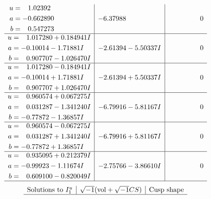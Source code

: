 \documentclass[1p]{elsarticle_modified}
\theoremstyle{definition}
\newcommand{\I}{\sqrt{-1}}
\begin{document}
$$\begin{array}{c|c|c}
\begin{aligned}
u &= \phantom{-}1.02392\phantom{ +0.000000I} \\
a &= -0.662890\phantom{ +0.000000I} \\
b &= \phantom{-}0.547273\phantom{ +0.000000I}\end{aligned}
 & -6.37988\phantom{ +0.000000I} & \phantom{-0.000000 } 0 \\ \hline\begin{aligned}
u &= \phantom{-}1.017280 + 0.184941 I \\
a &= -0.10014 - 1.71881 I \\
b &= \phantom{-}0.907707 - 1.026470 I\end{aligned}
 & -2.61394 - 5.50337 I & \phantom{-0.000000 } 0 \\ \hline\begin{aligned}
u &= \phantom{-}1.017280 - 0.184941 I \\
a &= -0.10014 + 1.71881 I \\
b &= \phantom{-}0.907707 + 1.026470 I\end{aligned}
 & -2.61394 + 5.50337 I & \phantom{-0.000000 } 0 \\ \hline\begin{aligned}
u &= \phantom{-}0.960574 + 0.067275 I \\
a &= \phantom{-}0.031287 - 1.341240 I \\
b &= -0.77872 - 1.36857 I\end{aligned}
 & -6.79916 - 5.81167 I & \phantom{-0.000000 } 0 \\ \hline\begin{aligned}
u &= \phantom{-}0.960574 - 0.067275 I \\
a &= \phantom{-}0.031287 + 1.341240 I \\
b &= -0.77872 + 1.36857 I\end{aligned}
 & -6.79916 + 5.81167 I & \phantom{-0.000000 } 0 \\ \hline\begin{aligned}
u &= \phantom{-}0.935095 + 0.212379 I \\
a &= -0.99923 - 1.11674 I \\
b &= \phantom{-}0.609100 - 0.820049 I\end{aligned}
 & -2.75766 - 3.86610 I & \phantom{-0.000000 } 0\\
 \hline 
 \end{array}$$\newpage$$\begin{array}{c|c|c}  
\text{Solutions to }I^u_{1}& \I (\text{vol} + \sqrt{-1}CS) & \text{Cusp shape}\\
 \hline 

\end{array}$$
\end{document}
